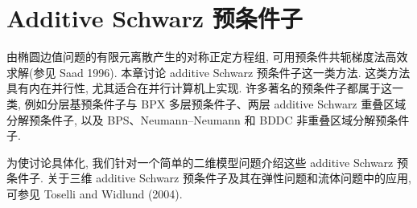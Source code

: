 \section{Additive Schwarz 预条件子}
\label{chap:ch07-additive-schwarz-preconditioners}

由椭圆边值问题的有限元离散产生的对称正定方程组, 可用预条件共轭梯度法高效求解(参见 Saad 1996). 本章讨论 additive Schwarz 预条件子这一类方法. 这类方法具有内在并行性, 尤其适合在并行计算机上实现. 许多著名的预条件子都属于这一类, 例如分层基预条件子与 BPX 多层预条件子、两层 additive Schwarz 重叠区域分解预条件子, 以及 BPS、Neumann--Neumann 和 BDDC 非重叠区域分解预条件子.

为使讨论具体化, 我们针对一个简单的二维模型问题介绍这些 additive Schwarz 预条件子. 关于三维 additive Schwarz 预条件子及其在弹性问题和流体问题中的应用, 可参见 Toselli and Widlund (2004).










